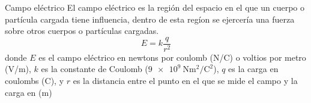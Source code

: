 \documentclass[aspectratio=169]{beamer}
\begin{document}
\begin{frame}{Campo eléctrico} 
    El campo eléctrico es la región del espacio en el que un cuerpo o partícula cargada tiene influencia, 
    dentro de esta regíon se ejercería una fuerza sobre otros cuerpos o partículas cargadas.  
    \begin{equation*}
        E = k\dfrac{q}{r^2}
    \end{equation*}
    donde $E$ es el campo eléctrico en newtons por coulomb (\si{\newton/\coulomb}) 
    o voltios por metro (\si{\volt/\meter}), $k$ es la constante de Coulomb ($\SI{9e9}{\newton \meter\squared / \coulomb \squared}$), 
    $q$ es la carga en coulombs (\si{\coulomb}), y $r$ es la distancia entre el punto en el que se mide el campo y la carga en (\si{\meter})   
\end{frame}

\end{document}

